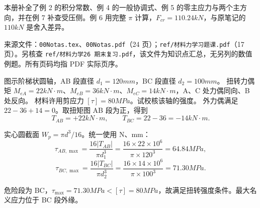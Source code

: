 \documentclass[a4paper,10pt,fontset=none]{ctexart}
\begin{document}
本册补全了例 2 的积分常数、例 4 的一般协调式、例 5 的零主应力与两个主方向，并在例 7 补查受压侧。例 6 用完整 $\pi$ 计算，$F_{cr}=110.24\unit{kN}$，与原笔记的 $110\unit{kN}$ 是舍入差异。

{\small\color{muted}来源文件：\texttt{00Notas.tex}、\texttt{00Notas.pdf}（24 页）；\texttt{ref/材料力学习题课.pdf}（17 页）。另核查 \texttt{ref/材料力学26 期末复习.pdf}，该文件为知识点汇总，无另列的数值例题。所有页码均指 PDF 实际页序。}

图示阶梯状圆轴，AB 段直径 $d_1=120\unit{mm}$，BC 段直径 $d_2=100\unit{mm}$。
扭转力偶矩 $M_{eA}=22\unit{kN\cdot m}$、$M_{eB}=36\unit{kN\cdot m}$、$M_{eC}=14\unit{kN\cdot m}$，A、C 处力偶同向、B 处反向。
材料许用剪应力 $[\tau]=80\unit{MPa}$。试校核该轴的强度。
外力偶满足 $22-36+14=0$。取扭矩图 AB 段为正，得到
\[
T_{AB}=+22\unit{kN\cdot m},\qquad T_{BC}=22-36=-14\unit{kN\cdot m}.
\]
\begin{center}
\end{center}
实心圆截面 $W_p=\pi d^3/16$。统一使用 N、mm：
\[
\tau_{AB,\max}=\frac{16|T_{AB}|}{\pi d_1^3}
=\frac{16\times22\times10^6}{\pi\times120^3}=64.84\unit{MPa},
\]
\[
\tau_{BC,\max}=\frac{16|T_{BC}|}{\pi d_2^3}
=\frac{16\times14\times10^6}{\pi\times100^3}=71.30\unit{MPa}.
\]
\begin{answerbox}
危险段为 BC，$\tau_{\max}=71.30\unit{MPa}<[\tau]=80\unit{MPa}$，故满足扭转强度条件。最大名义应力位于 BC 段外缘。
\end{answerbox}
\end{document}
